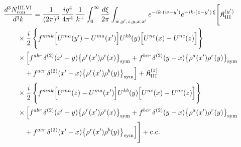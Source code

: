 \begin{align}\label{eq:H-III.VI-2}
&\frac{d^{3}N^{\rm III.VI}_{{\rm con}}}{d^{3}k}=\frac{1}{(2\pi)^{3}}\, \frac{ig^{4}}{4\pi^{4}}\, \frac{1}{k^{+}} \int_{0}^{\infty}\frac{d\xi}{2\pi} \int_{w,y',z,y,x,x'}e^{-ik\cdot(w-y')}e^{-ik\cdot(z-y')\,\xi}\Bigg[ \mathfrak{K}^{(y')}_{\rm III}\notag\\
&\quad\quad \times \frac{i}{2}\, \Bigg\{f^{mnk}\Big[U^{ma}(y')-U^{ma}(x')\Big]U^{kb}(y)\Big[U^{nc}(x)-U^{nc}(z)\Big]\Bigg\}\notag\\
&\quad\quad \times\Big[f^{abr}\, \delta^{(2)}(x'-y)\big\{\rho^{r}(x')\rho^{c}(x)\big\}_{\rm sym} +f^{bcr}\, \delta^{(2)}(y-x)\big\{\rho^{a}(x')\rho^{r}(y)\big\}_{\rm sym}\notag\\
&\quad\quad\quad +f^{acr}\, \delta^{(2)}(x'-x)\big\{\rho^{r}(x')\rho^{b}(y)\big\}_{\rm sym}\Big] + \mathfrak{K}^{(z)}_{\rm III}\notag\\
&\quad\quad \times \frac{i}{2}\, \Bigg\{f^{mnk}\Big[U^{ma}(z)-U^{ma}(x')\Big]U^{kb}(y)\Big[U^{nc}(x)-U^{nc}(z)\Big]\Bigg\}\notag\\
&\quad\quad \times\Big[f^{abr}\, \delta^{(2)}(x'-y)\big\{\rho^{r}(x')\rho^{c}(x)\big\}_{\rm sym} +f^{bcr}\, \delta^{(2)}(y-x)\big\{\rho^{a}(x')\rho^{r}(y)\big\}_{\rm sym}\notag\\
&\quad\quad\quad +f^{acr}\, \delta^{(2)}(x'-x)\big\{\rho^{r}(x')\rho^{b}(y)\big\}_{\rm sym}\Big]\Bigg] +{\rm c.c.}
\end{align}

